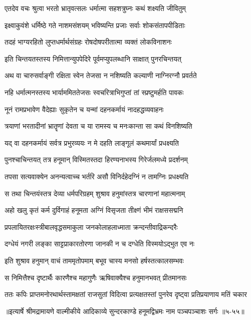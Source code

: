\twolineshloka
{एतदेव वचः श्रुत्वा भरतो भ्रातृवत्सलः}
{धर्मात्मा सहशत्रुघ्नः कथं शक्ष्यति जीवितुम्} %

\twolineshloka
{इक्ष्वाकुवंशे धर्मिष्ठे गते नाशमसंशयम्}
{भविष्यन्ति प्रजाः सर्वाः शोकसंतापपीडिताः} %

\twolineshloka
{तदहं भाग्यरहितो लुप्तधर्मार्थसंग्रहः}
{रोषदोषपरीतात्मा व्यक्तं लोकविनाशनः} %

\twolineshloka
{इति चिन्तयतस्तस्य निमित्तान्युपपेदिरे}
{पूर्वमप्युपलब्धानि साक्षात् पुनरचिन्तयत्} %

\twolineshloka
{अथ वा चारुसर्वाङ्गी रक्षिता स्वेन तेजसा}
{न नशिष्यति कल्याणी नाग्निरग्नौ प्रवर्तते} %

\twolineshloka
{नहि धर्मात्मनस्तस्य भार्याममिततेजसः}
{स्वचरित्राभिगुप्तां तां स्प्रष्टुमर्हति पावकः} %

\twolineshloka
{नूनं रामप्रभावेण वैदेह्याः सुकृतेन च}
{यन्मां दहनकर्मायं नादहद्धव्यवाहनः} %

\twolineshloka
{त्रयाणां भरतादीनां भ्रातॄणां देवता च या}
{रामस्य च मनःकान्ता सा कथं विनशिष्यति} %

\twolineshloka
{यद् वा दहनकर्मायं सर्वत्र प्रभुरव्ययः}
{न मे दहति लाङ्गूलं कथमार्यां प्रधक्ष्यति} %

\twolineshloka
{पुनश्चाचिन्तयत् तत्र हनूमान् विस्मितस्तदा}
{हिरण्यनाभस्य गिरेर्जलमध्ये प्रदर्शनम्} %

\twolineshloka
{तपसा सत्यवाक्येन अनन्यत्वाच्च भर्तरि}
{असौ विनिर्दहेदग्निं न तामग्निः प्रधक्ष्यति} %

\twolineshloka
{स तथा चिन्तयंस्तत्र देव्या धर्मपरिग्रहम्}
{शुश्राव हनुमांस्तत्र चारणानां महात्मनाम्} %

\twolineshloka
{अहो खलु कृतं कर्म दुर्विगाहं हनूमता}
{अग्निं विसृजता तीक्ष्णं भीमं राक्षससद्मनि} %

\twolineshloka
{प्रपलायितरक्षःस्त्रीबालवृद्धसमाकुला}
{जनकोलाहलाध्माता क्रन्दन्तीवाद्रिकन्दरैः} %

\twolineshloka
{दग्धेयं नगरी लङ्का साट्टप्राकारतोरणा}
{जानकी न च दग्धेति विस्मयोऽद्भुत एव नः} %

\twolineshloka
{इति शुश्राव हनुमान् वाचं ताममृतोपमाम्}
{बभूव चास्य मनसो हर्षस्तत्कालसम्भवः} %

\twolineshloka
{स निमित्तैश्च दृष्टार्थैः कारणैश्च महागुणैः}
{ऋषिवाक्यैश्च हनुमानभवत् प्रीतमानसः} %

\twolineshloka
{ततः कपिः प्राप्तमनोरथार्थस्तामक्षतां राजसुतां विदित्वा}
{प्रत्यक्षतस्तां पुनरेव दृष्ट्वा प्रतिप्रयाणाय मतिं चकार} %


॥इत्यार्षे श्रीमद्रामायणे वाल्मीकीये आदिकाव्ये सुन्दरकाण्डे हनूमद्विभ्रमः नाम पञ्चपञ्चाशः सर्गः ॥५-५५॥
